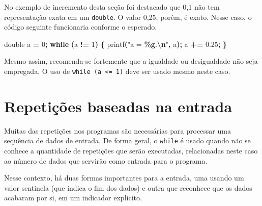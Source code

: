 \documentclass[
  11pt,
  a4paper,
]{scrbook}
\newenvironment{Shaded}{\begin{snugshade}}{\end{snugshade}}
\newcommand{\ControlFlowTok}[1]{\textcolor[rgb]{0.13,0.29,0.53}{\textbf{#1}}}
\newcommand{\DataTypeTok}[1]{\textcolor[rgb]{0.13,0.29,0.53}{#1}}
\newcommand{\DecValTok}[1]{\textcolor[rgb]{0.00,0.00,0.81}{#1}}
\newcommand{\FloatTok}[1]{\textcolor[rgb]{0.00,0.00,0.81}{#1}}
\newcommand{\NormalTok}[1]{#1}
\newcommand{\OperatorTok}[1]{\textcolor[rgb]{0.81,0.36,0.00}{\textbf{#1}}}
\newcommand{\SpecialCharTok}[1]{\textcolor[rgb]{0.81,0.36,0.00}{\textbf{#1}}}
\newcommand{\StringTok}[1]{\textcolor[rgb]{0.31,0.60,0.02}{#1}}
\begin{document}
\begin{tcolorbox}[enhanced jigsaw, arc=.35mm, bottomtitle=1mm, colbacktitle=quarto-callout-note-color!10!white, title=\textcolor{quarto-callout-note-color}{\faInfo}\hspace{0.5em}{Curiosidade}, toprule=.15mm, left=2mm, opacityback=0, colback=white, colframe=quarto-callout-note-color-frame, opacitybacktitle=0.6, bottomrule=.15mm, leftrule=.75mm, toptitle=1mm, coltitle=black, titlerule=0mm, rightrule=.15mm, breakable]

No exemplo de incremento desta seção foi destacado que 0,1 não tem
representação exata em um \texttt{double}. O valor 0,25, porém, é exato.
Nesse caso, o código seguinte funcionaria conforme o esperado.

\begin{Shaded}
\begin{Highlighting}[]
\DataTypeTok{double}\NormalTok{ a }\OperatorTok{=} \DecValTok{0}\OperatorTok{;}
\ControlFlowTok{while} \OperatorTok{(}\NormalTok{a }\OperatorTok{!=} \DecValTok{1}\OperatorTok{)} \OperatorTok{\{}
\NormalTok{    printf}\OperatorTok{(}\StringTok{"a = }\SpecialCharTok{\%g}\StringTok{.}\SpecialCharTok{\textbackslash{}n}\StringTok{"}\OperatorTok{,}\NormalTok{ a}\OperatorTok{);}
\NormalTok{    a }\OperatorTok{+=} \FloatTok{0.25}\OperatorTok{;}
\OperatorTok{\}}
\end{Highlighting}
\end{Shaded}

Mesmo assim, recomenda-se fortemente que a igualdade ou desigualdade não
seja empregada. O uso de \texttt{while\ (a\ \textless{}=\ 1)} deve ser
usado mesmo neste caso.

\end{tcolorbox}

\section{Repetições baseadas na
entrada}\label{repetiuxe7uxf5es-baseadas-na-entrada}

Muitas das repetições nos programas são necessárias para processar uma
sequência de dados de entrada. De forma geral, o \texttt{while} é usado
quando não se conhece a quantidade de repetições que serão executadas,
relacionadas neste caso ao número de dados que servirão como entrada
para o programa.

Nesse contexto, há duas formas importantes para a entrada, uma usando um
valor sentinela (que indica o fim dos dados) e outra que reconhece que
os dados acabaram por si, em um indicador explícito.
\end{document}
